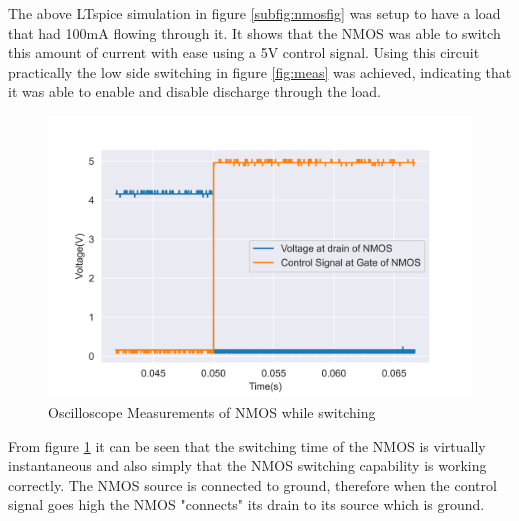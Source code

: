  The above LTspice simulation in figure \ref{subfig:nmosfig} was setup to have a load that had 100mA flowing through it. It shows that the NMOS was able to switch this amount of current with ease using a 5V control signal. Using this circuit practically the low side switching in figure \ref{fig:meas} was achieved, indicating that it was able to enable and disable discharge through the load.


\begin{figure}[!htb]
\centering
\includegraphics[scale=0.6]{./Figures/NMOSmeas}
\caption{Oscilloscope Measurements of NMOS while switching}
\label{fig:measNMOS}
\end{figure}

From figure \ref{fig:measNMOS} it can be seen that the switching time of the NMOS is virtually instantaneous and also simply that the NMOS switching capability is working correctly. The NMOS source is connected to ground, therefore when the control signal goes high the NMOS "connects" its drain to its source which is ground.


